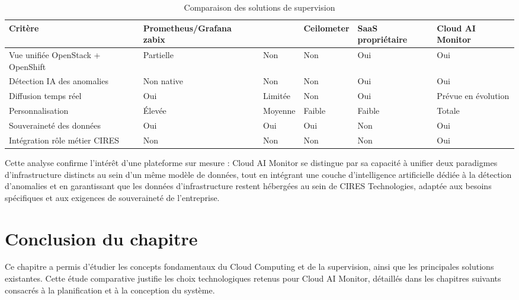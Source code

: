 \documentclass[11pt,a4paper]{report}
\begin{document}
\begin{table}[H]
\centering
\renewcommand{\arraystretch}{1.4}
\begin{tabular}{|p{3.3cm}|p{2.3cm}|p{2cm}|p{2.2cm}|p{2cm}|p{2.6cm}|}
\hline
\textbf{Critère} & \textbf{Prometheus/Grafana zabix} & \textbf{} & \textbf{Ceilometer} & \textbf{SaaS propriétaire} & \textbf{Cloud AI Monitor} \\
\hline
Vue unifiée OpenStack + OpenShift & Partielle & Non & Non & Oui & Oui \\
\hline
Détection IA des anomalies & Non native & Non & Non & Oui & Oui \\
\hline
Diffusion temps réel & Oui & Limitée & Non & Oui & Prévue en évolution \\
\hline
Personnalisation & Élevée & Moyenne & Faible & Faible & Totale \\
\hline
Souveraineté des données & Oui & Oui & Oui & Non & Oui \\
\hline
Intégration rôle métier CIRES & Non & Non & Non & Non & Oui \\
\hline
\end{tabular}
\caption{Comparaison des solutions de supervision}
\end{table}

Cette analyse confirme l'intérêt d'une plateforme sur mesure : Cloud AI
Monitor se distingue par sa capacité à unifier deux paradigmes
d'infrastructure distincts au sein d'un même modèle de données, tout en
intégrant une couche d'intelligence artificielle dédiée à la détection
d'anomalies et en garantissant que les données d'infrastructure restent
hébergées au sein de CIRES Technologies, adaptée aux besoins spécifiques et
aux exigences de souveraineté de l'entreprise.

\section*{Conclusion du chapitre}

Ce chapitre a permis d'étudier les concepts fondamentaux du Cloud Computing et
de la supervision, ainsi que les principales solutions existantes. Cette
étude comparative justifie les choix technologiques retenus pour Cloud AI
Monitor, détaillés dans les chapitres suivants consacrés à la planification
et à la conception du système.

\newpage
\end{document}

